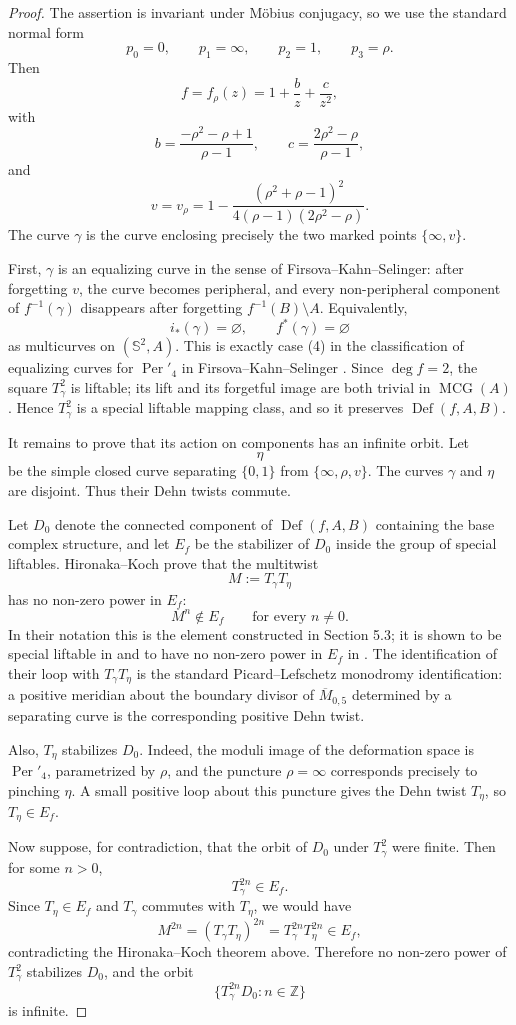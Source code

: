 \documentclass[11pt]{amsart}
\newcommand{\Sph}{\mathbb S}
\newcommand{\MCG}{\operatorname{MCG}}
\newcommand{\Def}{\operatorname{Def}}
\newcommand{\Per}{\operatorname{Per}}
\theoremstyle{plain}
\theoremstyle{remark}
\begin{document}
\begin{proof}
The assertion is invariant under Möbius conjugacy, so we use the standard
normal form
\[
p_0=0,\qquad p_1=\infty,\qquad p_2=1,\qquad p_3=\rho.
\]
Then
\[
f=f_\rho(z)=1+\frac{b}{z}+\frac{c}{z^2},
\]
with
\[
b=\frac{-\rho^2-\rho+1}{\rho-1},\qquad
c=\frac{2\rho^2-\rho}{\rho-1},
\]
and
\[
v=v_\rho
=1-\frac{(\rho^2+\rho-1)^2}{4(\rho-1)(2\rho^2-\rho)}.
\]
The curve \(\gamma\) is the curve enclosing precisely the two marked points
\(\{\infty,v\}\).

First, \(\gamma\) is an equalizing curve in the sense of Firsova--Kahn--Selinger:
after forgetting \(v\), the curve becomes peripheral, and every non-peripheral
component of \(f^{-1}(\gamma)\) disappears after forgetting
\(f^{-1}(B)\setminus A\).  Equivalently,
\[
i_*(\gamma)=\varnothing,\qquad f^*(\gamma)=\varnothing
\]
as multicurves on \((\Sph^2,A)\).  This is exactly case (4) in the classification
of equalizing curves for \(\Per'_4\) in Firsova--Kahn--Selinger
\cite[Appendix, case (4)]{FKS}.  Since \(\deg f=2\), the square \(T_\gamma^2\)
is liftable; its lift and its forgetful image are both trivial in
\(\MCG(A)\).  Hence \(T_\gamma^2\) is a special liftable mapping class, and so
it preserves \(\Def(f,A,B)\).

It remains to prove that its action on components has an infinite orbit.  Let
\[
\eta
\]
be the simple closed curve separating \(\{0,1\}\) from
\(\{\infty,\rho,v\}\).  The curves \(\gamma\) and \(\eta\) are disjoint.  Thus
their Dehn twists commute.

Let \(D_0\) denote the connected component of \(\Def(f,A,B)\) containing the
base complex structure, and let \(E_f\) be the stabilizer of \(D_0\) inside the
group of special liftables.  Hironaka--Koch prove that the multitwist
\[
M:=T_\gamma T_\eta
\]
has no non-zero power in \(E_f\):
\[
M^n\notin E_f\qquad\text{for every }n\neq 0.
\]
In their notation this is the element constructed in Section 5.3; it is shown
to be special liftable in \cite[Proposition 5.6]{HK} and to have no non-zero
power in \(E_f\) in \cite[Proposition 5.8]{HK}.  The identification of their
loop with \(T_\gamma T_\eta\) is the standard Picard--Lefschetz monodromy
identification: a positive meridian about the boundary divisor of
\(\overline{M}_{0,5}\) determined by a separating curve is the corresponding
positive Dehn twist.

Also, \(T_\eta\) stabilizes \(D_0\).  Indeed, the moduli image of the deformation
space is \(\Per'_4\), parametrized by \(\rho\), and the puncture \(\rho=\infty\)
corresponds precisely to pinching \(\eta\).  A small positive loop about this
puncture gives the Dehn twist \(T_\eta\), so \(T_\eta\in E_f\).

Now suppose, for contradiction, that the orbit of \(D_0\) under \(T_\gamma^2\)
were finite.  Then for some \(n>0\),
\[
T_\gamma^{2n}\in E_f.
\]
Since \(T_\eta\in E_f\) and \(T_\gamma\) commutes with \(T_\eta\), we would have
\[
M^{2n}=(T_\gamma T_\eta)^{2n}
      =T_\gamma^{2n}T_\eta^{2n}\in E_f,
\]
contradicting the Hironaka--Koch theorem above.  Therefore no non-zero power of
\(T_\gamma^2\) stabilizes \(D_0\), and the orbit
\[
\{T_\gamma^{2n}D_0:n\in\mathbb Z\}
\]
is infinite.
\end{proof}
\end{document}
